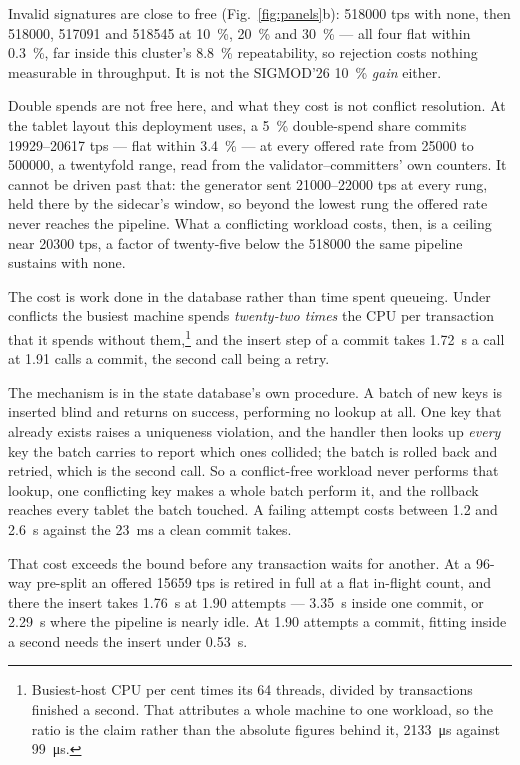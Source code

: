 \documentclass[10pt,twocolumn]{article}
\begin{document}
Invalid signatures are close to free (Fig.~\ref{fig:panels}b): \num{518000} tps with none, then
\num{518000}, \num{517091} and \num{518545} at \SI{10}{\percent}, \SI{20}{\percent} and
\SI{30}{\percent} --- all four flat within \SI{0.3}{\percent}, far inside this cluster's
\SI{8.8}{\percent} repeatability, so rejection costs nothing measurable in throughput. It is not the
SIGMOD'26 \SI{10}{\percent} \emph{gain} either.

Double spends are not free here, and what they cost is not conflict resolution. At the tablet layout this
deployment uses, a \SI{5}{\percent} double-spend share commits \SIrange{19929}{20617}{} tps --- flat within
\SI{3.4}{\percent} --- at every offered rate from \num{25000} to \num{500000}, a twentyfold range, read from
the validator--committers' own counters. It cannot be driven past that: the generator sent
\SIrange{21000}{22000}{} tps at every rung, held there by the sidecar's window, so beyond the lowest rung
the offered rate never reaches the pipeline. What a conflicting workload costs, then, is a ceiling near
\num{20300} tps, a factor of twenty-five below the \num{518000} the same pipeline sustains with none.

The cost is work done in the database rather than time spent queueing. Under conflicts the busiest machine
spends \emph{twenty-two times} the CPU per transaction that it spends without them,\footnote{Busiest-host CPU
per cent times its \num{64} threads, divided by transactions finished a second. That attributes a whole
machine to one workload, so the ratio is the claim rather than the absolute figures behind it,
\SI{2133}{\micro\second} against \SI{99}{\micro\second}.} and the insert step of a commit takes
\SI{1.72}{\second} a call at \num{1.91} calls a commit, the second call being a retry.

The mechanism is in the state database's own procedure. A batch of new keys is inserted blind and returns on
success, performing no lookup at all. One key that already exists raises a uniqueness violation, and the
handler then looks up \emph{every} key the batch carries to report which ones collided; the batch is rolled
back and retried, which is the second call. So a conflict-free workload never performs that lookup, one
conflicting key makes a whole batch perform it, and the rollback reaches every tablet the batch touched. A
failing attempt costs between \num{1.2} and \SI{2.6}{\second} against the \SI{23}{\milli\second} a clean
commit takes.

That cost exceeds the bound before any transaction waits for another. At a \num{96}-way pre-split an offered
\num{15659} tps is retired in full at a flat in-flight count, and there the insert takes \SI{1.76}{\second} at
\num{1.90} attempts --- \SI{3.35}{\second} inside one commit, or \SI{2.29}{\second} where the pipeline is
nearly idle. At \num{1.90} attempts a commit, fitting inside a second needs the insert under
\SI{0.53}{\second}.
\end{document}
